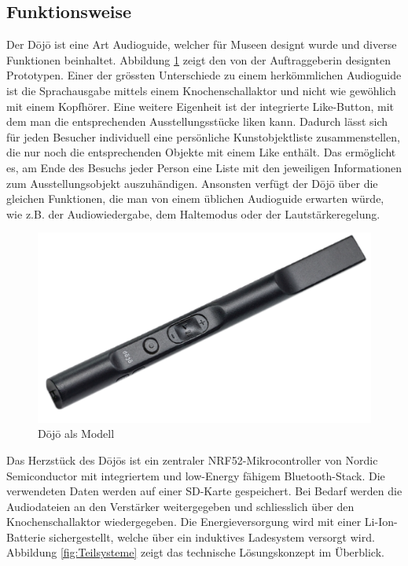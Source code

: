 \subsection{Funktionsweise} \label{sec:funktionsweise}
Der Dōjō ist eine Art Audioguide, welcher für Museen designt wurde und diverse Funktionen beinhaltet. Abbildung \ref{fig:Funktion Dojo} zeigt den von der Auftraggeberin designten Prototypen. Einer der grössten Unterschiede zu einem herkömmlichen Audioguide ist die Sprachausgabe mittels einem Knochenschallaktor und nicht wie gewöhlich mit einem Kopfhörer. Eine weitere Eigenheit ist der integrierte {\glqq Like\grqq}-Button, mit dem man die entsprechenden Ausstellungsstücke {\glqq liken\grqq} kann. Dadurch lässt sich für jeden Besucher individuell eine persönliche Kunstobjektliste zusammenstellen, die nur noch die entsprechenden Objekte mit einem {\glqq Like\grqq} enthält. Das ermöglicht es, am Ende des Besuchs jeder Person eine Liste mit den jeweiligen Informationen zum Ausstellungsobjekt auszuhändigen. Ansonsten verfügt der Dōjō über die gleichen Funktionen, die man von einem üblichen Audioguide erwarten würde, wie z.B. der Audiowiedergabe, dem Haltemodus oder der Lautstärkeregelung.

\begin{figure}[H]
	\begin{center}
		\includegraphics[width=120mm]{data/Dojo.png}
		\caption[Dōjō als Modell]{Dōjō als Modell} %
		\label{fig:Funktion Dojo}
	\end{center}
\end{figure}

Das Herzstück des Dōjōs ist ein zentraler NRF52-Mikrocontroller von Nordic Semiconductor mit integriertem und low-Energy fähigem Bluetooth-Stack. Die verwendeten Daten werden auf einer SD-Karte gespeichert. Bei Bedarf werden die Audiodateien an den Verstärker weitergegeben und schliesslich über den Knochenschallaktor wiedergegeben. Die Energieversorgung wird mit einer Li-Ion-Batterie sichergestellt, welche über ein induktives Ladesystem versorgt wird. Abbildung \ref{fig:Teilsysteme} zeigt das technische Lösungskonzept im Überblick.

